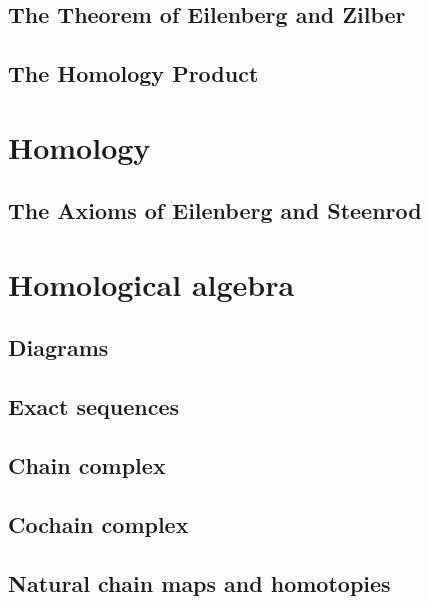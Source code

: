 \documentclass[11pt]{book} %
\begin{document}
\section{The Theorem of Eilenberg and Zilber}
\section{The Homology Product}
\chapter{Homology}
\section{The Axioms of Eilenberg and Steenrod}


\chapter{Homological algebra}
\section{Diagrams}
\section{Exact sequences}
\section{Chain complex}
\section{Cochain complex}
\section{Natural chain maps and homotopies}
\end{document}
